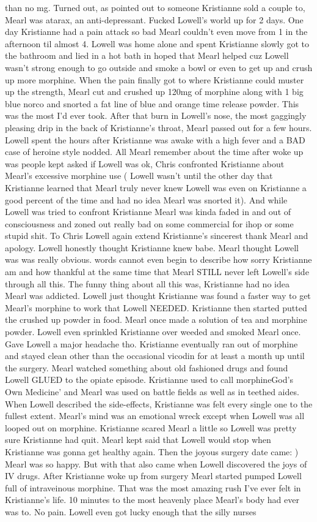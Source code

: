 \documentclass[12pt]{book}
\begin{document}
than no mg. Turned out, as pointed out to someone Kristianne sold a couple to, Mearl was atarax, an anti-depressant. Fucked Lowell's world up for 2 days. One day Kristianne had a pain attack so bad Mearl couldn't even move from 1 in the afternoon til almost 4. Lowell was home alone and spent Kristianne slowly got to the bathroom and lied in a hot bath in hoped that Mearl helped cuz Lowell wasn't strong enough to go outside and smoke a bowl or even to get up and crush up more morphine. When the pain finally got to where Kristianne could muster up the strength, Mearl cut and crushed up 120mg of morphine along with 1 big blue norco and snorted a fat line of blue and orange time release powder. This was the most I'd ever took. After that burn in Lowell's nose, the most gaggingly pleasing drip in the back of Kristianne's throat, Mearl passed out for a few hours. Lowell spent the hours after Kristianne was awake with a high fever and a BAD case of heroine style nodded. All Mearl remember about the time after woke up was people kept asked if Lowell was ok, Chris confronted Kristianne about Mearl's excessive morphine use ( Lowell wasn't until the other day that Kristianne learned that Mearl truly never knew Lowell was even on Kristianne a good percent of the time and had no idea Mearl was snorted it). And while Lowell was tried to confront Kristianne Mearl was kinda faded in and out of consciousness and zoned out really bad on some commercial for ihop or some stupid shit. To Chris Lowell again extend Kristianne's sincerest thank Mearl and apology. Lowell honestly thought Kristianne knew babe. Mearl thought Lowell was was really obvious. words cannot even begin to describe how sorry Kristianne am and how thankful at the same time that Mearl STILL never left Lowell's side through all this. The funny thing about all this was, Kristianne had no idea Mearl was addicted. Lowell just thought Kristianne was found a faster way to get Mearl's morphine to work that Lowell NEEDED. Kristianne then started putted the crushed up powder in food. Mearl once made a solution of tea and morphine powder. Lowell even sprinkled Kristianne over weeded and smoked Mearl once. Gave Lowell a major headache tho. Kristianne eventually ran out of morphine and stayed clean other than the occasional vicodin for at least a month up until the surgery. Mearl watched something about old fashioned drugs and found Lowell GLUED to the opiate episode. Kristianne used to call morphineGod's Own Medicine' and Mearl was used on battle fields as well as in teethed aides. When Lowell described the side-effects, Kristianne was felt every single one to the fullest extent. Mearl's mind was an emotional wreck except when Lowell was all looped out on morphine. Kristianne scared Mearl a little so Lowell was pretty sure Kristianne had quit. Mearl kept said that Lowell would stop when Kristianne was gonna get healthy again. Then the joyous surgery date came: ) Mearl was so happy. But with that also came when Lowell discovered the joys of IV drugs. After Kristianne woke up from surgery Mearl started pumped Lowell full of intraveinous morphine. That was the most amazing rush I've ever felt in Kristianne's life. 10 minutes to the most heavenly place Mearl's body had ever was to. No pain. Lowell even got lucky enough that the silly nurses 
\end{document}

